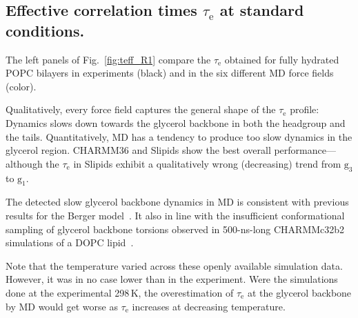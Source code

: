 \documentclass[journal=jcisd8,manuscript=article,layout=twocolumn]{achemso}
\begin{document}
\subsection*{Effective correlation times $\tau_\mathrm e$ at standard conditions.}
The left panels of Fig.~\ref{fig:teff_R1} compare the $\tau_\mathrm{e}$ obtained for fully hydrated POPC bilayers in experiments (black) and in the six different MD force fields (color).

Qualitatively, every force field captures the general shape of the $\tau_\mathrm{e}$ profile: Dynamics slows down towards the glycerol backbone in both the headgroup and the tails. Quantitatively, MD has a tendency to produce too slow dynamics in the glycerol region.
CHARMM36 and Slipids show the best overall performance---although the $\tau_\mathrm{e}$ in Slipids exhibit a qualitatively wrong (decreasing) trend from $\mathrm g_{3}$ to $\mathrm g_{1}$.

The detected slow glycerol backbone dynamics in MD is consistent with previous results for the Berger model~\cite{ferreira15}. It also in line with the insufficient conformational sampling of glycerol backbone torsions observed in 500-ns-long CHARMMc32b2~\cite{schlenkrich96,feller00} simulations of a DOPC lipid~\cite{vogel12}. %


Note that the temperature varied across these openly available simulation data. However, it was in no case lower than in the experiment. 
Were the simulations done at the experimental 298\,K, the overestimation of $\tau_\mathrm{e}$ at the glycerol backbone by MD would get worse as $\tau_\mathrm{e}$  increases at decreasing temperature.
\end{document}
